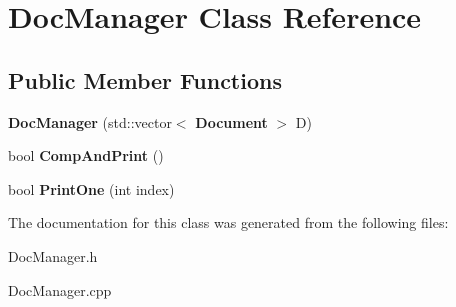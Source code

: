 \section{Doc\+Manager Class Reference}
\label{class_doc_manager}
\subsection*{Public Member Functions}
\begin{DoxyCompactItemize}
\item 
\mbox{\label{class_doc_manager_aa2af2982dd3f4339a14877e22e90d023}} 
{\bfseries Doc\+Manager} (std\+::vector$<$ \textbf{ Document} $>$ D)
\item 
\mbox{\label{class_doc_manager_ada2ef44281704a251136bec75569e62d}} 
bool {\bfseries Comp\+And\+Print} ()
\item 
\mbox{\label{class_doc_manager_a4b2f3f9ab1ebe8bbd8a1fa8475ca4a79}} 
bool {\bfseries Print\+One} (int index)
\end{DoxyCompactItemize}


The documentation for this class was generated from the following files\+:\begin{DoxyCompactItemize}
\item 
Doc\+Manager.\+h\item 
Doc\+Manager.\+cpp\end{DoxyCompactItemize}
